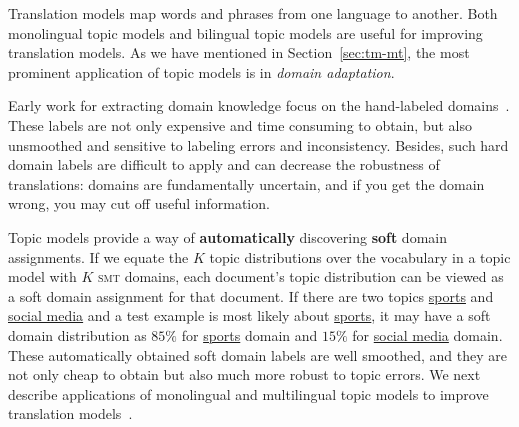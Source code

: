 Translation models map words and phrases from one language to another.
Both monolingual topic models and bilingual topic models are useful for improving translation models.
As we have mentioned in Section~\ref{sec:tm-mt}, 
the most prominent application of topic models is in {\em domain adaptation}.

Early work for extracting domain knowledge focus on the hand-labeled domains~\citep{foster-07,matsoukas-09,chiang-11}.
These labels are not only expensive and time consuming to obtain, but also unsmoothed and sensitive 
to labeling errors and inconsistency. Besides, such hard domain labels are difficult to 
apply and can decrease the robustness of translations: domains are fundamentally uncertain, 
and if you get the domain wrong, you may cut off useful information.

Topic models provide a way of \textbf{automatically} discovering \textbf{soft} domain assignments. 
If we equate the $K$ topic distributions over the vocabulary in a topic model with $K$ 
\textsc{smt} domains, each document's topic distribution can be viewed as a soft
domain assignment for that document.
If there are two topics \underline{sports} and \underline{social media} and
a test example is most likely about \underline{sports}, it may
have a soft domain distribution as $85\%$ for \underline{sports}
domain and $15\%$ for \underline{social media} domain. These automatically
obtained soft domain labels are well smoothed, and they are not only
cheap to obtain but also much more robust to topic errors. 
We next describe applications of monolingual and multilingual
topic models to improve translation models~\citep{Eidelman-12,hu-14}.





